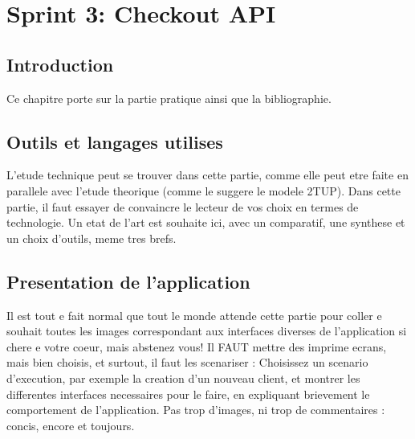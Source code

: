 
\setcounter{chapter}{4}
\chapter{Sprint 3: Checkout API}
\minitoc %
\graphicspath{{Chapter5/figures/}}

\pagestyle{fancy}
\fancyhf{}
\fancyhead[R]{\bfseries\rightmark}
\fancyfoot[R]{\thepage}
\renewcommand{\headrulewidth}{0.5pt}
\renewcommand{\footrulewidth}{0pt}
\renewcommand{\chaptermark}[1]{\markboth{\MakeUppercase{\chaptername~\thechapter. #1 }}{}}
\renewcommand{\sectionmark}[1]{\markright{\thechapter.\thesection~ #1}}

\begin{spacing}{1.2}

\section*{Introduction}
Ce chapitre porte sur la partie pratique ainsi que la bibliographie.

\section{Outils et langages utilises}
L'etude technique peut se trouver dans cette partie, comme elle peut etre faite en
parallele avec l'etude theorique (comme le suggere le modele 2TUP).
Dans cette partie, il faut essayer de convaincre le lecteur de vos choix en termes de
technologie. Un etat de l'art est souhaite ici, avec un comparatif, une synthese et un choix 
d'outils, meme tres brefs.
\section{Presentation de l'application}
Il est tout e fait normal que tout le monde attende cette partie pour coller e souhait toutes les images
correspondant aux interfaces diverses de l'application si chere e votre coeur, mais
abstenez vous! Il FAUT mettre des imprime ecrans, mais bien choisis, et surtout, il faut les scenariser : Choisissez un scenario d'execution, par exemple la creation d'un 
nouveau client, et montrer les differentes interfaces necessaires pour le faire, en
expliquant brievement le comportement de l'application. Pas trop d'images, ni trop de
commentaires : concis, encore et toujours.


\end{spacing}
